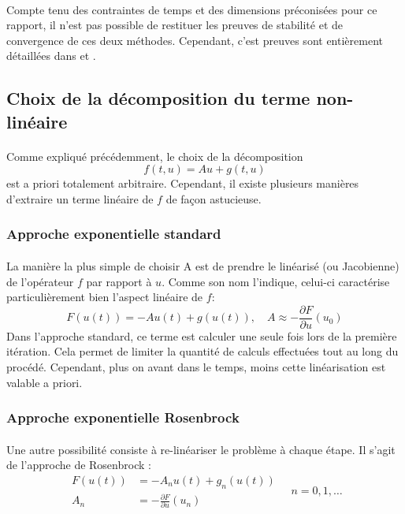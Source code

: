         \paragraph{}
        Compte tenu des contraintes de temps et des dimensions préconisées pour ce rapport, il n'est pas possible de restituer les preuves de stabilité et de convergence de ces deux méthodes. Cependant, c'est preuves sont entièrement détaillées dans \cite{ExpIntegrators} et \cite{Taylor}.

\subsection{Choix de la décomposition du terme non-linéaire}

    \paragraph{}
    Comme expliqué précédemment, le choix de la décomposition $$f(t,u) = Au+g(t,u)$$ est a priori totalement arbitraire. Cependant, il existe plusieurs manières d'extraire un terme linéaire de $f$ de façon astucieuse.

    \subsubsection{Approche exponentielle standard}
        \paragraph{}
        La manière la plus simple de choisir A est de prendre le linéarisé (ou Jacobienne) de l'opérateur $f$ par rapport à $u$. Comme son nom l'indique, celui-ci caractérise particulièrement bien l'aspect linéaire de $f$:
        \begin{equation} 
            F(u(t))=-A u(t)+g(u(t)), \quad A \approx-\frac{\partial F}{\partial u}\left(u_{0}\right)
        \end{equation}
        Dans l'approche standard, ce terme est calculer une seule fois lors de la première itération. Cela permet de limiter la quantité de calculs effectuées tout au long du procédé. Cependant, plus on avant dans le temps, moins cette linéarisation est valable a priori.

    \subsubsection{Approche exponentielle Rosenbrock}
        \paragraph{}
        Une autre possibilité consiste à re-linéariser le problème à chaque étape. Il s'agit de l'approche de Rosenbrock :
        \begin{equation} 
            \begin{aligned}
                F(u(t)) &=-A_{n} u(t)+g_{n}(u(t)) \\
                A_{n} &=-\frac{\partial F}{\partial u}\left(u_{n}\right)
            \end{aligned}
            \quad n=0, 1, \ldots
        \end{equation}


